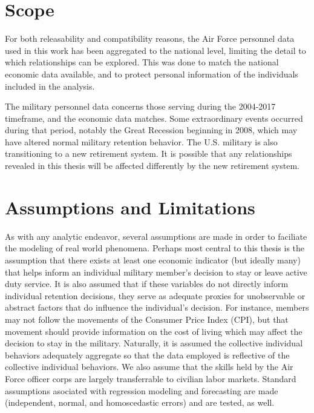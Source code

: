 \documentclass[12pt,letterpaper,toc=flat,oneside]{report}
\theoremstyle{definition}
\theoremstyle{definition}
\theoremstyle{definition}
\theoremstyle{remark}
\begin{document}
\hypertarget{scope}{%
\section{Scope}\label{scope}}

For both releasability and compatibility reasons, the Air Force
personnel data used in this work has been aggregated to the national
level, limiting the detail to which relationships can be explored. This
was done to match the national economic data available, and to protect
personal information of the individuals included in the analysis.

The military personnel data concerns those serving during the 2004-2017
timeframe, and the economic data matches. Some extraordinary events
occurred during that period, notably the Great Recession beginning in
2008, which may have altered normal military retention behavior. The
U.S. military is also transitioning to a new retirement system. It is
possible that any relationships revealed in this thesis will be affected
differently by the new retirement system.

\hypertarget{assumptions-and-limitations}{%
\section{Assumptions and
Limitations}\label{assumptions-and-limitations}}

As with any analytic endeavor, several assumptions are made in order to
faciliate the modeling of real world phenomena. Perhaps most central to
this thesis is the assumption that there exists at least one economic
indicator (but ideally many) that helps inform an individual military
member's decision to stay or leave active duty service. It is also
assumed that if these variables do not directly inform individual
retention decisions, they serve as adequate proxies for unobservable or
abstract factors that do influence the individual's decision. For
instance, members may not follow the movements of the Consumer Price
Index (CPI), but that movement should provide information on the cost of
living which may affect the decision to stay in the military. Naturally,
it is assumed the collective individual behaviors adequately aggregate
so that the data employed is reflective of the collective individual
behaviors. We also assume that the skills held by the Air Force officer
corps are largely transferrable to civilian labor markets. Standard
assumptions asociated with regression modeling and forecasting are made
(independent, normal, and homoscedastic errors) and are tested, as well.
\end{document}
